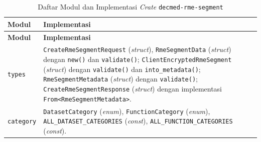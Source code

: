 \documentclass[bahasa, 12pt, a4paper, onecolumn, oneside, final]{report}
\begin{document}
\begingroup
\small
\begin{longtable}{|>{\raggedright\arraybackslash}p{}|>{\raggedright\arraybackslash}p{}|}
	\caption{Daftar Modul dan Implementasi \textit{Crate} \texttt{decmed-rme-segment}}
	\label{tab:modul-crate-decmed-rme-segment}                                                                                                                                                                                                                                                                                                                                                                                                                        \\
	\hline
	\textbf{Modul} & \textbf{Implementasi}                                                                                                                                                                                                                                                                                                                                                                                                                            \\
	\hline
	\endfirsthead
	\hline
	\textbf{Modul} & \textbf{Implementasi}                                                                                                                                                                                                                                                                                                                                                                                                                            \\
	\hline
	\endhead

	\texttt{types}
	               & \texttt{CreateRmeSegmentRequest} (\textit{struct}), \texttt{RmeSegmentData} (\textit{struct}) dengan \texttt{new()} dan \texttt{validate()}; \texttt{ClientEncryptedRmeSegment} (\textit{struct}) dengan \texttt{validate()} dan \texttt{into\_metadata()}; \texttt{RmeSegmentMetadata} (\textit{struct}) dengan \texttt{validate()}; \texttt{CreateRmeSegmentResponse} (\textit{struct}) dengan implementasi \texttt{From<RmeSegmentMetadata>}.
	\\ \hline

	\texttt{category}
	               & \texttt{DatasetCategory} (\textit{enum}), \texttt{FunctionCategory} (\textit{enum}), \texttt{ALL\_DATASET\_CATEGORIES} (\textit{const}), \texttt{ALL\_FUNCTION\_CATEGORIES} (\textit{const}).
	\\ \hline


\end{longtable}
\end{document}
